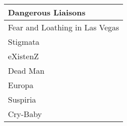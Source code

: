 \documentclass[dvipsnames]{beamer}
\theoremstyle{plain}
\begin{document}
\begin{frame}[fragile]
\begin{columns}[b]
    \begin{tiny}
    \begin{table}
      \begin{tabular}{|l|}\hline
Dangerous Liaisons            \\\hline
Fear and Loathing in Las Vegas\\\hline
Stigmata                      \\\hline
eXistenZ                      \\\hline
Dead Man                      \\\hline
Europa                        \\\hline
Suspiria                      \\\hline
Cry-Baby                      \\\hline
      \end{tabular}
    \end{table}
    \end{tiny}
  \end{columns}
\end{frame}
\end{document}

